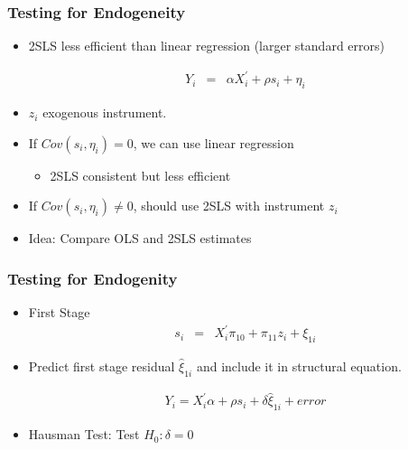 \documentclass[pdftex]{beamer}
\begin{document}
\begin{frame}
\frametitle{Testing for Endogeneity}
\begin{itemize}
\item 2SLS less efficient than linear regression (larger standard errors)

\begin{eqnarray*}
   Y_{i} &=& \alpha X_{i}^{'}+ \rho s_{i}+ \eta_{i}
\end{eqnarray*}

\item $z_{i}$ exogenous instrument.
\item If $Cov\left(s_{i}, \eta_{i}\right)=0$, we can use linear regression
    \begin {itemize}
    \item 2SLS consistent but less efficient
  \end {itemize}
\item If $Cov\left(s_{i}, \eta_{i}\right)\neq0$, should use 2SLS with instrument $z_{i}$

\item Idea: Compare OLS and 2SLS estimates


\end{itemize}

\end{frame}




\begin{frame}
\frametitle{Testing for Endogenity}
\begin{itemize}
      \item First Stage
       \begin{eqnarray*}
           s_{i} &=& X_{i}^{'}\pi_{10}+ \pi_{11}z_{i}+ \xi_{1i}
      \end{eqnarray*}

     \item Predict first stage residual $\hat{\xi}_{1i}$ and include it in structural equation.

\begin{eqnarray*}
           Y_{i}= X_{i}^{'}\alpha+ \rho s_{i}+ \delta\hat{\xi}_{1i}+ error
      \end{eqnarray*}
\item Hausman Test: Test $H_{0}: \delta=0$

\end{itemize}

\end{frame}
\end{document}
